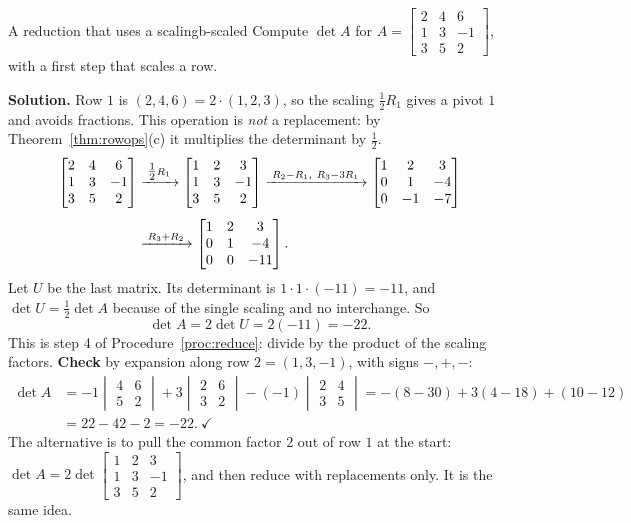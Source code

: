 \documentclass[11pt]{article}
\begin{document}
\begin{exmp}{A reduction that uses a scaling}{b-scaled}
Compute $\det A$ for $A=\begin{bmatrix}2&4&6\\1&3&-1\\3&5&2\end{bmatrix}$, with a first step that scales a row.

\textbf{Solution.} Row $1$ is $(2,4,6)=2\cdot(1,2,3)$, so the scaling $\tfrac12R_1$ gives a pivot $1$ and avoids fractions. This operation is \emph{not} a replacement: by Theorem~\ref{thm:rowops}(c) it multiplies the determinant by $\tfrac12$.
\begin{align*}
\begin{bmatrix}2&4&6\\1&3&-1\\3&5&2\end{bmatrix}
&\xrightarrow{\;\tfrac12R_1\;}
\begin{bmatrix}1&2&3\\1&3&-1\\3&5&2\end{bmatrix}
\xrightarrow{\;R_2-R_1,\ R_3-3R_1\;}
\begin{bmatrix}1&2&3\\0&1&-4\\0&-1&-7\end{bmatrix}
\\[4pt]
&\xrightarrow{\;R_3+R_2\;}
\begin{bmatrix}1&2&3\\0&1&-4\\0&0&-11\end{bmatrix}
.
\end{align*}
Let $U$ be the last matrix. Its determinant is $1\cdot1\cdot(-11)=-11$, and $\det U=\tfrac12\det A$ because of the single scaling and no interchange. So
\[
\det A=2\det U=2(-11)=-22.
\]
This is step 4 of Procedure~\ref{proc:reduce}: divide by the product of the scaling factors. \textbf{Check} by expansion along row $2=(1,3,-1)$, with signs $-,+,-$:
\begin{align*}
\det A&=-1\begin{vmatrix}4&6\\5&2\end{vmatrix}+3\begin{vmatrix}2&6\\3&2\end{vmatrix}-(-1)\begin{vmatrix}2&4\\3&5\end{vmatrix}=-(8-30)+3(4-18)+(10-12)\\&=22-42-2=-22.\ \checkmark
\end{align*}
The alternative is to pull the common factor $2$ out of row $1$ at the start: $\det A=2\det\begin{bmatrix}1&2&3\\1&3&-1\\3&5&2\end{bmatrix}$, and then reduce with replacements only. It is the same idea.
\end{exmp}
\end{document}
